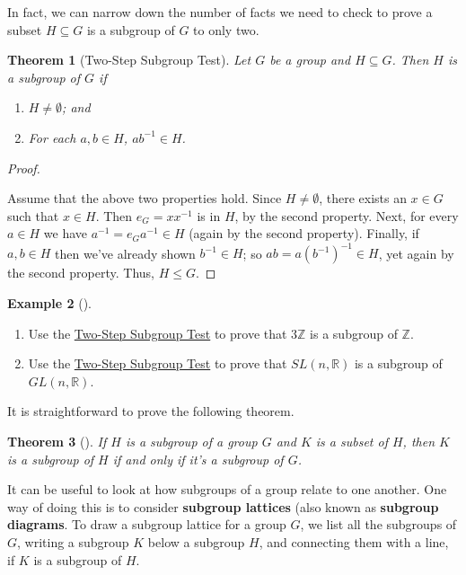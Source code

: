 \documentclass[10pt,openany,oneside]{book}
\newcommand{\terminology}[1]{\textbf{#1}}
\theoremstyle{plain}
\newtheorem{theorem}{Theorem}[section]
\theoremstyle{definition}
\theoremstyle{definition}
\theoremstyle{definition}
\newtheorem{example}[theorem]{Example}
\theoremstyle{definition}
\numberwithin{equation}{section}
\def\Z{\mathbb{Z}}
\def\R{\mathbb{R}}
\begin{document}
In fact, we can narrow down the number of facts we need to check to prove a subset \(H\subseteq G\) is a subgroup of \(G\) to only two.%
\begin{theorem}[{Two-Step Subgroup Test}]\label{twostep}
Let \(G\) be a group and \(H\subseteq G\). Then \(H\) is a subgroup of \(G\) if \leavevmode%
\begin{enumerate}
\item\hypertarget{li-209}{}\(H\neq \emptyset\); and%
\item\hypertarget{li-210}{}For each \(a,b\in H\), \(ab^{-1}\in H\).%
\end{enumerate}
%
\end{theorem}
\begin{proof}\hypertarget{proof-17}{}
Assume that the above two properties hold. Since \(H\neq
\emptyset\), there exists an \(x\in G\) such that \(x\in H\). Then \(e_G=xx^{-1}\) is in \(H\), by the second property. Next, for every \(a\in H\) we have \(a^{-1}=e_Ga^{-1}\in H\) (again by the second property). Finally, if \(a,b\in H\) then we've already shown \(b^{-1}\in H\); so \(ab=a(b^{-1})^{-1}\in H\), yet again by the second property. Thus, \(H\leq G\).%
\end{proof}
\begin{example}[]\label{example-36}
\leavevmode%
\begin{enumerate}
\item\hypertarget{li-211}{}Use the \hyperref[twostep]{Two-Step Subgroup Test} to prove that \(3\Z\) is a subgroup of \(\Z\).%
\item\hypertarget{li-212}{}Use the \hyperref[twostep]{Two-Step Subgroup Test} to prove that \(SL(n,\R)\) is a subgroup of \(GL(n,\R)\).%
\end{enumerate}
%
\end{example}
It is straightforward to prove the following theorem.%
\begin{theorem}[{}]\label{theorem-20}
If \(H\) is a subgroup of a group \(G\) and \(K\) is a subset of \(H\), then \(K\) is a subgroup of \(H\) if and only if it's a subgroup of \(G\).%
\end{theorem}
It can be useful to look at how subgroups of a group relate to one another. One way of doing this is to consider \terminology{subgroup lattices} (also known as \terminology{subgroup diagrams}. To draw a subgroup lattice for a group \(G\), we list all the subgroups of \(G\), writing a subgroup \(K\) below a subgroup \(H\), and connecting them with a line, if \(K\) is a subgroup of \(H\).%
\end{document}
